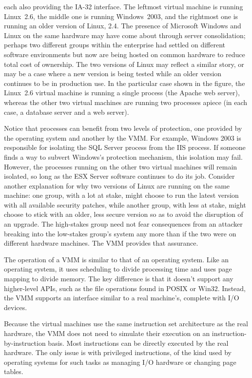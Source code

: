 each also providing the IA-32 interface.  The leftmost virtual machine
is running Linux~2.6, the middle one is running Windows~2003, and the
rightmost one is running an older version of Linux, 2.4.  The presence
of Microsoft Windows and Linux on the same hardware may have come
about through server consolidation; perhaps two different groups
within the enterprise had settled on different software environments
but now are being hosted on common hardware to reduce total cost of
ownership.  The two versions of Linux may reflect a similar story, or
may be a case where a new version is being tested while an older
version continues to be in production use.  In the particular case
shown in the figure, the Linux~2.6 virtual machine is running a single
process (the Apache web server), whereas the other two virtual
machines are running two processes apiece (in each case, a database
server and a web server).

Notice that processes can benefit from two levels of
protection, one provided by the operating system and another by the
VMM.  For example, Windows 2003 is responsible for isolating the SQL
Server process from the IIS process.  If someone finds a way to
subvert Windows's protection mechanism, this isolation may fail.
However, the processes running on the other two virtual machines will
remain isolated, so long as the ESX Server software continues to do
its job.  Consider another explanation for why two versions of
Linux are running on the same machine: one group, with a lot at stake,
might choose to run the latest version with all available security
patches, while another group, with less at stake, might choose to
stick with an older, less secure version so as to avoid the disruption
of an upgrade.  The high-stakes group need not fear consequences from
an attacker breaking into the low-stakes group's system any more than
if the two were on different hardware machines.  The VMM provides that
assurance.

The operation of a VMM is similar to that of an operating system.
Like an operating system, it uses scheduling to divide processing time
and uses page mapping to divide memory.  The key difference is that it
doesn't support any higher-level APIs, such as the file operations
found in POSIX or Win32. Instead, the VMM supports an
interface similar to a real machine's, complete with I/O devices.

Because the virtual machines use the same instruction set architecture
as the real hardware, the VMM does not need to simulate their
execution on an instruction-by-instruction basis.  Most instructions
can be directly executed by the real hardware.  The only issue is with
privileged instructions, of the kind used by operating systems for
such tasks as managing I/O hardware or changing page tables.

